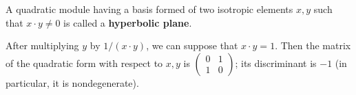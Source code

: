 A quadratic module having a basis formed of two isotropic elements $x, y$ such that $x \cdot y \neq 0$ is called a \textbf{hyperbolic plane}.

After multiplying $y$ by $1/(x \cdot y)$, we can suppose that $x \cdot y = 1$. Then the matrix of the quadratic form with respect to $x, y$ is $\begin{pmatrix} 0 & 1 \\ 1 & 0 \end{pmatrix}$; its discriminant is $-1$ (in particular, it is nondegenerate).
